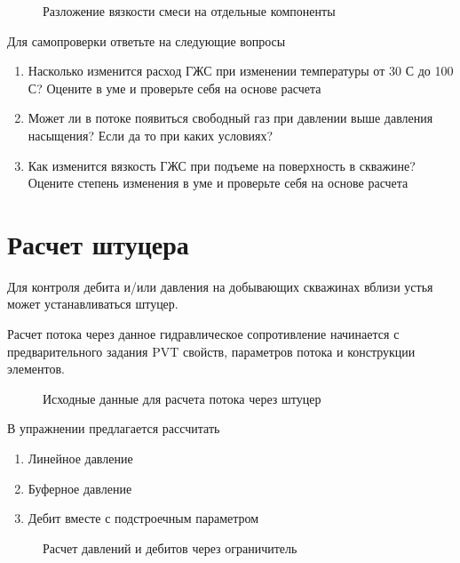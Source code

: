 \begin{figure}[h!]
	\center{\texttt{[image: Ex30\_4]}}
	\caption{Разложение вязкости смеси на отдельные компоненты}
	\label{ris:Ex30_4}
\end{figure}

Для самопроверки ответьте на следующие вопросы

\begin{enumerate}
	\item Насколько изменится расход ГЖС при изменении температуры от 30 С до 100 С? Оцените в уме и проверьте себя на основе расчета
	\item Может ли в потоке появиться свободный газ при давлении выше давления насыщения? Если да то при каких условиях?
	\item Как изменится вязкость ГЖС при подъеме на поверхность в скважине? Оцените степень изменения в уме и проверьте себя на основе расчета
\end{enumerate}


\section{Расчет штуцера}

Для контроля дебита и/или давления на добывающих скважинах вблизи устья может устанавливаться штуцер.

Расчет потока через данное гидравлическое сопротивление начинается с предварительного задания PVT свойств, параметров потока и конструкции элементов.

\begin{figure}[h!]
	\center{\texttt{[image: Ex40\_1]}}
	\caption{Исходные данные для расчета потока через штуцер}
	\label{ris:Ex40_1}
\end{figure}

В упражнении предлагается рассчитать

\begin{enumerate}
	\item Линейное давление
	\item Буферное давление
	\item Дебит вместе с подстроечным параметром
\end{enumerate}


\begin{figure}[h!]
	\center{\texttt{[image: Ex40\_2]}}
	\caption{Расчет давлений и дебитов через ограничитель}
	\label{ris:Ex40_2}
\end{figure}

